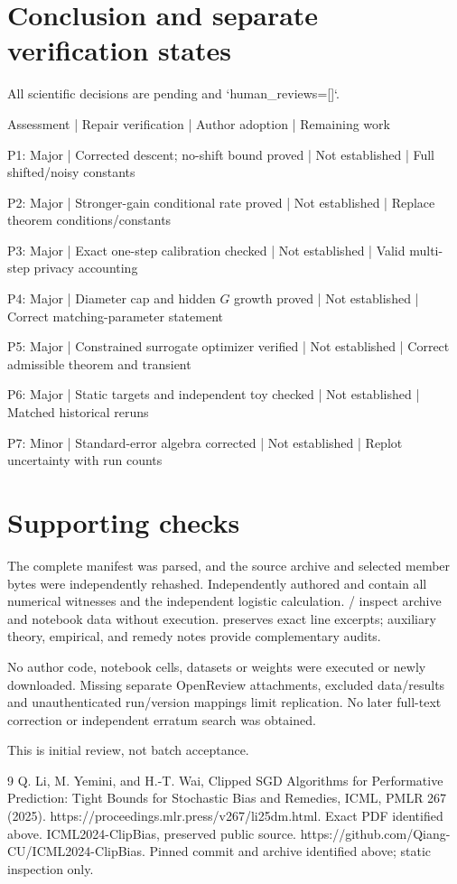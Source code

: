 \documentclass[10pt]{article}
\begin{document}
\section*{Conclusion and separate verification states}
All scientific decisions are pending and `human\_reviews=[]`.\par
Assessment | Repair verification | Author adoption | Remaining work\par
P1: Major | Corrected descent; no-shift bound proved | Not established | Full shifted/noisy constants\par
P2: Major | Stronger-gain conditional rate proved | Not established | Replace theorem conditions/constants\par
P3: Major | Exact one-step calibration checked | Not established | Valid multi-step privacy accounting\par
P4: Major | Diameter cap and hidden \(G\) growth proved | Not established | Correct matching-parameter statement\par
P5: Major | Constrained surrogate optimizer verified | Not established | Correct admissible theorem and transient\par
P6: Major | Static targets and independent toy checked | Not established | Matched historical reruns\par
P7: Minor | Standard-error algebra corrected | Not established | Replot uncertainty with run counts\par
\section*{Supporting checks}
The complete manifest was parsed, and the source archive and selected member bytes were independently rehashed. Independently authored and contain all numerical witnesses and the independent logistic calculation. / inspect archive and notebook data without execution. preserves exact line excerpts; auxiliary theory, empirical, and remedy notes provide complementary audits.\par
No author code, notebook cells, datasets or weights were executed or newly downloaded. Missing separate OpenReview attachments, excluded data/results and unauthenticated run/version mappings limit replication. No later full-text correction or independent erratum search was obtained.\par
This is initial review, not batch acceptance.\par
9 Q. Li, M. Yemini, and H.-T. Wai, Clipped SGD Algorithms for Performative Prediction: Tight Bounds for Stochastic Bias and Remedies, ICML, PMLR 267 (2025). https://proceedings.mlr.press/v267/li25dm.html. Exact PDF identified above. ICML2024-ClipBias, preserved public source. https://github.com/Qiang-CU/ICML2024-ClipBias. Pinned commit and archive identified above; static inspection only.\par
\end{document}
